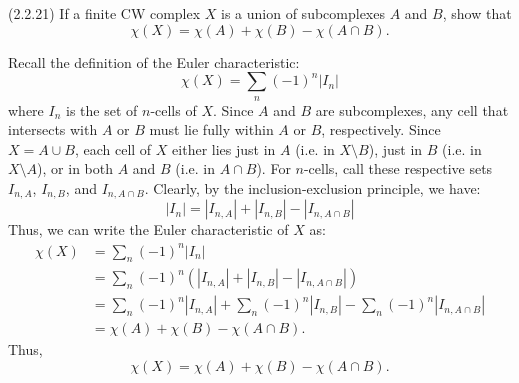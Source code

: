 \documentclass[12pt]{article}
\begin{document}
\begin{solution}
\end{solution}

\newpage


\begin{problem}{3}(2.2.21) 
    If a finite CW complex $X$ is a union of subcomplexes $A$ and $B$, show that 
\[ \chi(X) = \chi(A) + \chi(B) - \chi(A \cap B). \]
\end{problem}
\begin{solution}
    Recall the definition of the Euler characteristic:
    \[ \chi(X) = \sum_n (-1)^n |I_n| \]
    where $I_n$ is the set of $n$-cells of $X$. Since $A$ and $B$ are subcomplexes, any cell that intersects with $A$ or $B$ must lie fully within $A$ or $B$, respectively. Since $X = A \cup B$, each cell of $X$ either lies just in $A$ (i.e. in $X\setminus B$), just in $B$ (i.e. in $X\setminus A$), or in both $A$ and $B$ (i.e. in $A \cap B$). For $n$-cells, call these respective sets $I_{n, A}$, $I_{n, B}$, and $I_{n, A \cap B}$. Clearly, by the inclusion-exclusion principle, we have: 
    \[ |I_n| = |I_{n, A}| + |I_{n, B}| - |I_{n, A\cap B}|\]
    Thus, we can write the Euler characteristic of $X$ as:
    \begin{align*}
    \chi(X) &= \sum_n (-1)^n |I_n| \\
    &= \sum_n (-1)^n \left( |I_{n, A}| + |I_{n, B}| - |I_{n, A\cap B}| \right) \\
    &= \sum_n (-1)^n |I_{n, A}| + \sum_n (-1)^n |I_{n, B}| - \sum_n (-1)^n |I_{n, A\cap B}| \\
    &= \chi(A) + \chi(B) - \chi(A \cap B).
    \end{align*}
    Thus, 
    \[ \chi(X) = \chi(A) + \chi(B) - \chi(A \cap B). \]
\end{solution}
\newpage
\end{document}
